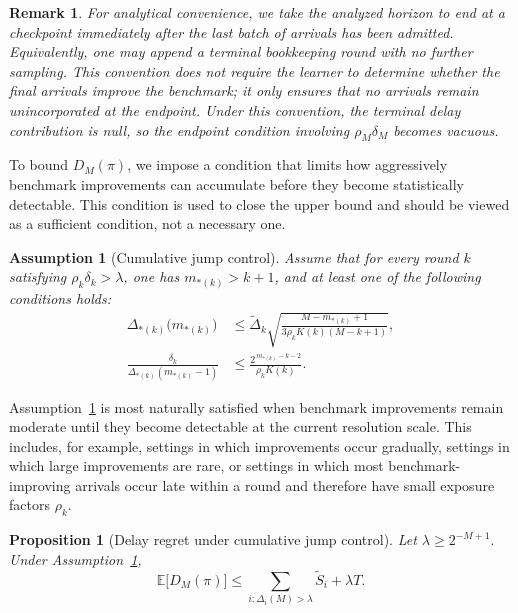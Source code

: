 \documentclass[11pt]{article}
\newtheorem{note}{Remark}
\newtheorem{proposition}{Proposition}
\newtheorem{assumption}{Assumption}
\begin{document}
\begin{note}
For analytical convenience, we take the analyzed horizon to end at a checkpoint immediately
after the last batch of arrivals has been admitted. Equivalently, one may append a terminal
bookkeeping round with no further sampling. This convention does not require the learner to
determine whether the final arrivals improve the benchmark; it only ensures that no arrivals
remain unincorporated at the endpoint. Under this convention, the terminal delay contribution
is null, so the endpoint condition involving \(\rho_M\delta_M\) becomes vacuous.
\end{note}

To bound \(D_M(\pi)\), we impose a condition that limits how aggressively benchmark
improvements can accumulate before they become statistically detectable. This condition is
used to close the upper bound and should be viewed as a sufficient condition, not a necessary
one.

\begin{assumption}[Cumulative jump control]\label{ass:delay_cum}
Assume that for every round $k$ satisfying $\rho_k\delta_k>\lambda$, one has $m_{*(k)}>k+1$,
and at least one of the following conditions holds:
\begin{align}
\Delta_{*(k)}\bigl(m_{*(k)}\bigr)
&\le
\tilde{\Delta}_k
\sqrt{
\frac{M-m_{*(k)}+1}{3\rho_k K(k)(M-k+1)}
},
\label{eq:delay-cond-1}
\\
\frac{\delta_k}{\Delta_{*(k)}(m_{*(k)}-1)}
&\le
\frac{2^{\,m_{*(k)}-k-2}}{\rho_k K(k)}.
\label{eq:delay-cond-2}
\end{align}
\end{assumption}
Assumption~\ref{ass:delay_cum} is most naturally satisfied when benchmark improvements remain moderate until
they become detectable at the current resolution scale. This includes, for example, settings in
which improvements occur gradually, settings in which large improvements are rare, or settings
in which most benchmark-improving arrivals occur late within a round and therefore have
small exposure factors \(\rho_k\).

\begin{proposition}[Delay regret under cumulative jump control]\label{prop:delay_cum}
Let
\(
\lambda\ge 2^{-M+1}.
\)
Under Assumption~\ref{ass:delay_cum},
\[
\mathbb{E}\bigl[D_M(\pi)\bigr]
\le
\sum_{i:\Delta_i(M)>\lambda}\tilde S_i+\lambda T.
\]
\end{proposition}
\end{document}
